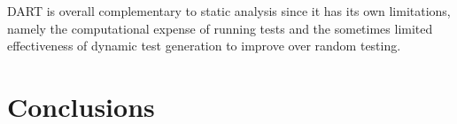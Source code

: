 \documentclass[11pt]{article}
\begin{document}
	    	DART is overall complementary to static analysis since it has its own limitations, namely the computational expense of running tests and the sometimes limited effectiveness of dynamic test generation to improve over random testing.


  \section{Conclusions}


\pagebreak
{}

\end{document}
